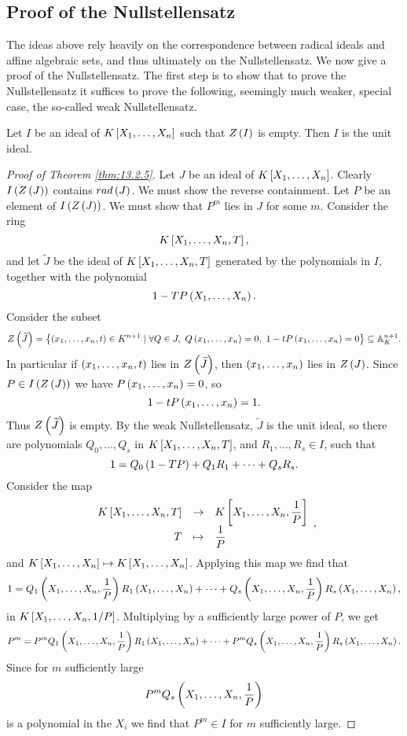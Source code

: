 \pagebreak

\subsection{Proof of the Nullstellensatz}

The ideas above rely heavily on the correspondence between radical ideals and affine algebraic sets, and thus ultimately on the Nullstellensatz. We now give a proof of the Nullstellensatz. The first step is to show that to prove the Nullstellensatz it suffices to prove the following, seemingly much weaker, special case, the so-called weak Nullstellensatz.

\begin{theorem}
\label{thm:13.3.1}
Let $ I $ be an ideal of $ K\sb{X_1, \dots, X_n} $ such that $ Z\rb{I} $ is empty. Then $ I $ is the unit ideal.
\end{theorem}

\begin{proof}[Proof of Theorem \ref{thm:13.2.5}]
Let $ J $ be an ideal of $ K\sb{X_1, \dots, X_n} $. Clearly $ I\rb{Z\rb{J}} $ contains $ rad\rb{J} $. We must show the reverse containment. Let $ P $ be an element of $ I\rb{Z\rb{J}} $. We must show that $ P^m $ lies in $ J $ for some $ m $. Consider the ring
$$ K\sb{X_1, \dots, X_n, T}, $$
and let $ \widetilde{J} $ be the ideal of $ K\sb{X_1, \dots, X_n, T} $ generated by the polynomials in $ I $, together with the polynomial
$$ 1 - TP\rb{X_1, \dots, X_n}. $$
Consider the subset
$$ Z\rb{\widetilde{J}} = \cb{\rb{x_1, \dots, x_n, t} \in K^{n + 1} \mid \forall Q \in J, \ Q\rb{x_1, \dots, x_n} = 0, \ 1 - tP\rb{x_1, \dots, x_n} = 0} \subseteq \A_K^{n + 1}. $$
In particular if $ \rb{x_1, \dots, x_n, t} $ lies in $ Z\rb{\widetilde{J}} $, then $ \rb{x_1, \dots, x_n} $ lies in $ Z\rb{J} $. Since $ P \in I\rb{Z\rb{J}} $ we have $ P\rb{x_1, \dots, x_n} = 0 $, so
$$ 1 - tP\rb{x_1, \dots, x_n} = 1. $$
Thus $ Z\rb{\widetilde{J}} $ is empty. By the weak Nullstellensatz, $ \widetilde{J} $ is the unit ideal, so there are polynomials $ Q_0, \dots, Q_s $ in $ K\sb{X_1, \dots, X_n, T} $, and $ R_1, \dots, R_s \in I $, such that
$$ 1 = Q_0\rb{1 - TP} + Q_1R_1 + \dots + Q_sR_s. $$
Consider the map
$$ \function{K\sb{X_1, \dots, X_n, T}}{K\sb{X_1, \dots, X_n, \dfrac{1}{P}}}{T}{\dfrac{1}{P}}, $$
and $ K\sb{X_1, \dots, X_n} \mapsto K\sb{X_1, \dots, X_n} $. Applying this map we find that
$$ 1 = Q_1\rb{X_1, \dots, X_n, \dfrac{1}{P}}R_1\rb{X_1, \dots, X_n} + \dots + Q_s\rb{X_1, \dots, X_n, \dfrac{1}{P}}R_s\rb{X_1, \dots, X_n}, $$
in $ K\sb{X_1, \dots, X_n, 1 / P} $. Multiplying by a sufficiently large power of $ P $, we get
$$ P^m = P^mQ_1\rb{X_1, \dots, X_n, \dfrac{1}{P}}R_1\rb{X_1, \dots, X_n} + \dots + P^mQ_s\rb{X_1, \dots, X_n, \dfrac{1}{P}}R_s\rb{X_1, \dots, X_n}. $$
Since for $ m $ sufficiently large
$$ P^mQ_s\rb{X_1, \dots, X_n, \dfrac{1}{P}} $$
is a polynomial in the $ X_i $ we find that $ P^m \in I $ for $ m $ sufficiently large.
\end{proof}

